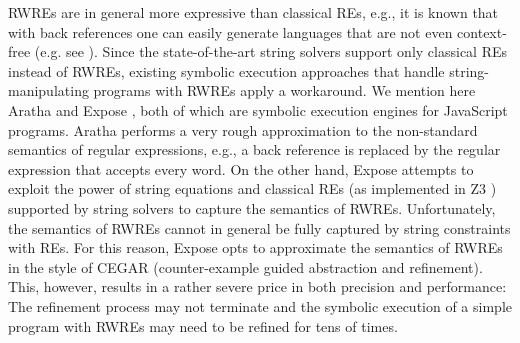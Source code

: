 RWREs are in general more expressive than classical REs, e.g., it is known that
with back references one can easily generate languages that are not even 
context-free (e.g. see \cite{FS19}). %
Since the state-of-the-art string solvers support only classical REs instead of
RWREs, %
existing symbolic execution approaches that handle
string-manipulating programs with RWREs apply a workaround.
We mention here Aratha \cite{aratha} and Expose \cite{LMK19}, both of which are
symbolic execution engines for JavaScript programs.
Aratha performs a very rough approximation to the 
non-standard semantics of regular expressions, e.g., a back reference
is replaced by the regular expression that accepts every word.
On the other hand, Expose attempts to exploit the power of string 
equations and classical REs (as implemented in Z3 \cite{Z3}) supported by string
solvers to capture the 
semantics of RWREs. Unfortunately, the semantics of RWREs cannot 
in general be fully captured by string constraints with REs. 
For this reason, 
Expose opts to approximate the semantics of RWREs in the style of 
CEGAR (counter-example guided abstraction and refinement). This, however,
results in a rather severe price in both precision and performance: The refinement process may not terminate and the symbolic execution of a simple program with RWREs may need to be refined for tens of times. 


